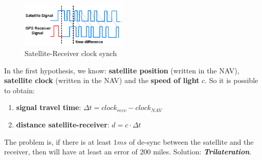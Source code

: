 \begin{figure}[h]
    \centering 
    \includegraphics[width=0.45\textwidth]{img/hp_theory}
    \caption{Satellite-Receiver clock synch}
\end{figure}
In the first hypothesis, we know: \textbf{satellite position} (written in the NAV), \textbf{satellite clock} (written in the NAV) and the \textbf{speed of light} $c$. So it is possible to obtain:
\begin{enumerate}[nosep]
    \item \textbf{signal travel time}: $\Delta t = clock_{recv} - clock_{NAV}$
    \item \textbf{distance satellite-receiver}: $d = c \cdot \Delta t$
\end{enumerate}
The problem is, if there is at least $1ms$ of de-sync between the satellite and the receiver, then will have at least an error of 200 miles.
Solution: \textbf{\textit{Trilateration}}.

